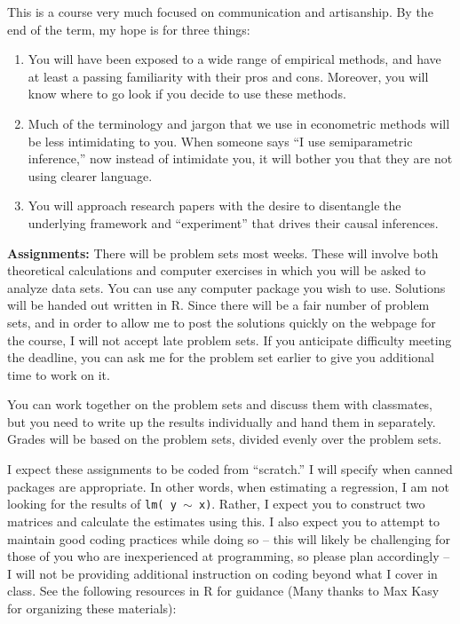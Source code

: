 \documentclass[11pt, a4paper]{article}
\begin{document}
This is a course very much focused on communication and
artisanship. By the end of the term, my hope is for three things:

\begin{enumerate}
\item You will have been exposed to a wide range of empirical methods,
  and have at least a passing familiarity with their pros and
  cons. Moreover, you will know where to go look if you decide to use
  these methods.
\item Much of the terminology and jargon that we use in econometric
  methods will be less intimidating to you. When someone says ``I use
  semiparametric inference,'' now instead of intimidate you, it will
  bother you that they are not using clearer language.
\item You will approach research papers with the desire to disentangle
  the underlying framework and ``experiment'' that drives their causal
  inferences.
\end{enumerate}

\noindent\textbf{Assignments:}
There will be problem sets most weeks. These will involve both
theoretical calculations and computer exercises in which you will be
asked to analyze data sets. You can use any computer package you wish
to use. Solutions will be handed out written in R. Since there will be
a fair number of problem sets, and in order to allow me to post the
solutions quickly on the webpage for the course, I will not accept
late problem sets. If you anticipate difficulty meeting the deadline,
you can ask me for the problem set earlier to give you additional time
to work on it.

You can work together on the problem sets and discuss them with
classmates, but you need to write up the results individually and hand
them in separately. Grades will be based on the problem sets, divided
evenly over the problem sets.

I expect these assignments to be coded from ``scratch.'' I will
specify when canned packages are appropriate. In other words, when
estimating a regression, I am not looking for the results of
\texttt{lm( y $\sim$ x)}. Rather, I expect you to construct two
matrices and calculate the estimates using this. I also expect you to
attempt to maintain good coding practices while doing so -- this will
likely be challenging for those of you who are inexperienced at
programming, so please plan accordingly -- I will not be providing
additional instruction on coding beyond what I cover in class.  See
the following resources in R for guidance (Many thanks to Max Kasy for
organizing these materials):
\end{document}
